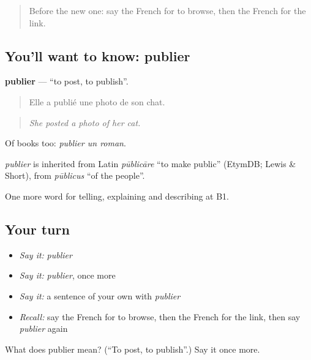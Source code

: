 \label{lesson:FR-C398-publier}



\begin{quote}
Before the new one: say the French for to browse, then the French for the link.
\end{quote}

\subsection*{You'll want to know: publier}
\textbf{publier} — \textquotedblleft{}to post, to publish\textquotedblright{}.

\begin{quote}
Elle a publié une photo de son chat.
\end{quote}

\begin{quote}
\emph{She posted a photo of her cat.}
\end{quote}

Of books too: \emph{publier un roman}.

\begin{cousinweb}
\emph{publier} is inherited from Latin \emph{pūblicāre} \textquotedblleft{}to make public\textquotedblright{} (EtymDB; Lewis \& Short), from \emph{pūblicus} \textquotedblleft{}of the people\textquotedblright{}.
\end{cousinweb}

\begin{grammarlens}[title={What you've built}]
One more word for telling, explaining and describing at B1.
\end{grammarlens}

\subsection*{Your turn}
\begin{itemize}
\raggedright
  \item \emph{Say it:} \emph{publier}
  \item \emph{Say it:} \emph{publier}, once more
  \item \emph{Say it:} a sentence of your own with \emph{publier}
  \item \emph{Recall:} say the French for to browse, then the French for the link, then say \emph{publier} again
\end{itemize}

\begin{tcolorbox}[breakable,colback=teal!4,colframe=teal!35!black,title={Before you move on}]
What does publier mean? (\textquotedblleft{}To post, to publish\textquotedblright{}.) Say it once more.
\end{tcolorbox}
